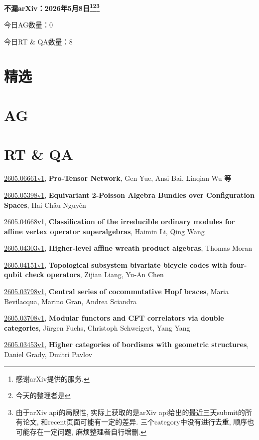 \documentclass[9pt, a4paper]{article}
\theoremstyle{plain}
\theoremstyle{definition}
\theoremstyle{remark}
\newcommand{\arxiv}[3]{\href{https://arxiv.org/abs/#1}{#1}, \textbf{\textcolor{arxivblue}{#2}}, #3}
\newcommand{\AGnumber}{0}
\newcommand{\RTQAnumber}{8}
\newcommand{\NewestDate}{2026年5月8日}
\newcommand{\todayarXiver}{} %
\begin{document}
\begin{center}
    \Huge\textbf{不漏arXiv：\NewestDate\footnote{感谢arXiv提供的服务.}\footnote{今天的整理者是\todayarXiver}\footnote{由于arXiv api的局限性, 实际上获取的是arXiv api给出的最近三天submit的所有论文, 和recent页面可能有一定的差异. 三个category中没有进行去重, 顺序也可能存在一定问题, 麻烦整理者自行增删.}} \\
\end{center}

\setcounter{section}{-1}

\begin{center}
    今日AG数量：\AGnumber
    
    今日RT \& QA数量：\RTQAnumber
    
\end{center}


\section{精选}


\section{AG}

\section{RT \& QA}
\arxiv{2605.06661v1}{Pro-Tensor Network}{Gen Yue, Ansi Bai, Linqian Wu 等}

\arxiv{2605.05398v1}{Equivariant 2-Poisson Algebra Bundles over Configuration Spaces}{Hai Châu Nguyên}

\arxiv{2605.04668v1}{Classification of the irreducible ordinary modules for affine vertex operator superalgebras}{Haimin Li, Qing Wang}

\arxiv{2605.04303v1}{Higher-level affine wreath product algebras}{Thomas Moran}

\arxiv{2605.04151v1}{Topological subsystem bivariate bicycle codes with four-qubit check operators}{Zijian Liang, Yu-An Chen}

\arxiv{2605.03798v1}{Central series of cocommutative Hopf braces}{Maria Bevilacqua, Marino Gran, Andrea Sciandra}

\arxiv{2605.03708v1}{Modular functors and CFT correlators via double categories}{Jürgen Fuchs, Christoph Schweigert, Yang Yang}

\arxiv{2605.03453v1}{Higher categories of bordisms with geometric structures}{Daniel Grady, Dmitri Pavlov}

\end{document}
